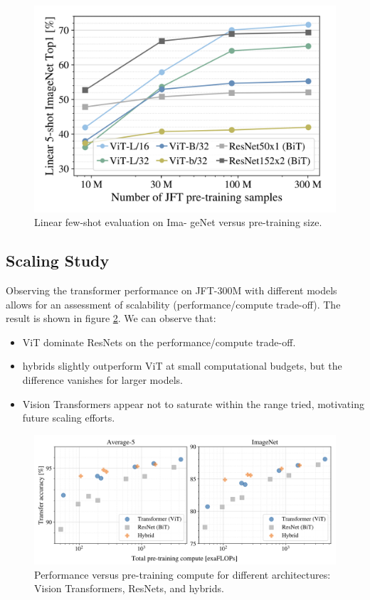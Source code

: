 \documentclass[12pt]{article}
\begin{document}
\begin{figure}
    \centering
    \includegraphics[width=0.7\linewidth]{images/data_size2.png}
    \caption{Linear few-shot evaluation on Ima- geNet versus pre-training size.}
    \label{fig:data_size2}
\end{figure}


\subsection{Scaling Study}

Observing the transformer performance on JFT-300M with different models allows for an assessment of scalability (performance/compute trade-off). The result is shown in figure \ref{fig:model_vary}.  We can observe that:

\begin{itemize}
    \item ViT dominate ResNets on the performance/compute trade-off.
    \item hybrids slightly outperform ViT at small computational budgets, but the difference vanishes for larger models.
    \item Vision Transformers appear not to saturate within the range tried, motivating future scaling efforts.
\end{itemize}

\begin{figure}
    \centering
    \includegraphics[width=1\linewidth]{images/model_vary.png}
    \caption{Performance versus pre-training compute for different architectures: Vision Transformers, ResNets, and hybrids.}
    \label{fig:model_vary}
\end{figure}
\end{document}
